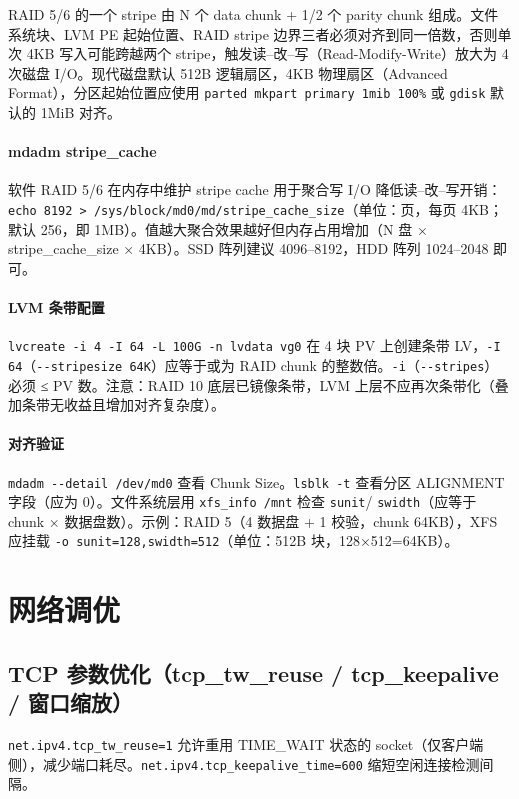 \documentclass[12pt,UTF8]{ctexbook}
\begin{document}
RAID 5/6 的一个 stripe 由 N 个 data chunk + 1/2 个 parity chunk 组成。文件系统块、LVM PE 起始位置、RAID stripe 边界三者必须对齐到同一倍数，否则单次 4KB 写入可能跨越两个 stripe，触发读--改--写（Read-Modify-Write）放大为 4 次磁盘 I/O。现代磁盘默认 512B 逻辑扇区，4KB 物理扇区（Advanced Format），分区起始位置应使用 \verb|parted mkpart primary 1mib 100%| 或 \verb|gdisk| 默认的 1MiB 对齐。

\paragraph{mdadm stripe\_cache}

软件 RAID 5/6 在内存中维护 stripe cache 用于聚合写 I/O 降低读--改--写开销：\verb|echo 8192 > /sys/block/md0/md/stripe_cache_size|（单位：页，每页 4KB；默认 256，即 1MB）。值越大聚合效果越好但内存占用增加（N 盘 × stripe\_cache\_size × 4KB）。SSD 阵列建议 4096--8192，HDD 阵列 1024--2048 即可。

\paragraph{LVM 条带配置}

\verb|lvcreate -i 4 -I 64 -L 100G -n lvdata vg0| 在 4 块 PV 上创建条带 LV，\verb|-I 64|（\verb|--stripesize 64K|）应等于或为 RAID chunk 的整数倍。\verb|-i|（\verb|--stripes|）必须 ≤ PV 数。注意：RAID 10 底层已镜像条带，LVM 上层不应再次条带化（叠加条带无收益且增加对齐复杂度）。

\paragraph{对齐验证}

\verb|mdadm --detail /dev/md0| 查看 Chunk Size。\verb|lsblk -t| 查看分区 ALIGNMENT 字段（应为 0）。文件系统层用 \verb|xfs_info /mnt| 检查 \verb|sunit|/ \verb|swidth|（应等于 chunk × 数据盘数）。示例：RAID 5（4 数据盘 + 1 校验，chunk 64KB），XFS 应挂载 \verb|-o sunit=128,swidth=512|（单位：512B 块，128×512=64KB）。

  \section{网络调优}
    \subsection{TCP 参数优化（tcp\_tw\_reuse / tcp\_keepalive / 窗口缩放）}

\verb|net.ipv4.tcp_tw_reuse=1| 允许重用 TIME\_WAIT 状态的 socket（仅客户端侧），减少端口耗尽。\verb|net.ipv4.tcp_keepalive_time=600| 缩短空闲连接检测间隔。
\end{document}
